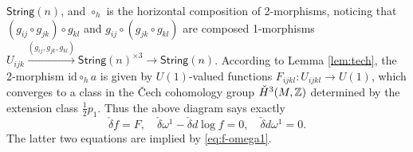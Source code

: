 \documentclass[letterpaper,10pt, oneside]{article} %
\newcommand{\String}{\mathsf{String}}%
\newcommand{\half}{\frac{1}{2}}
\newcommand{\id}{\mathrm{id}}
\begin{document}
\begin{itemize}
$\String(n)$, and $\circ_h$ is the horizontal composition of
2-morphisms, noticing that $(g_{ij} \circ g_{jk}) \circ g_{kl}$ and
$g_{ij} \circ (g_{jk} \circ g_{kl} )$ are composed 1-morphisms $U_{ijk}
\xrightarrow{ (g_{ij}, g_{jk}, g_{kl})} \String(n)^{\times 3}\to \String(n)$. According to Lemma \ref{lem:tech}, the 2-morphism
$\id\circ_h a$ is given by $U(1)$-valued functions $F_{ijkl}: U_{ijkl}\to U(1)$, which
converges to a class in the \v{C}ech cohomology group $ \check{H}^3(M, \mathbb Z)$ determined by the extension class $\half p_1$. Thus the above diagram
says exactly
\begin{equation}\label{eq:f-F-omega1}
\check{\delta} f =F, \quad \check{\delta} \omega^1 - \check{\delta}
d\log f =0, \quad \check{\delta} d \omega^1 = 0.
\end{equation}
The latter two equations are implied by
\eqref{eq:f-omega1}.
\end{itemize}
\end{document}
